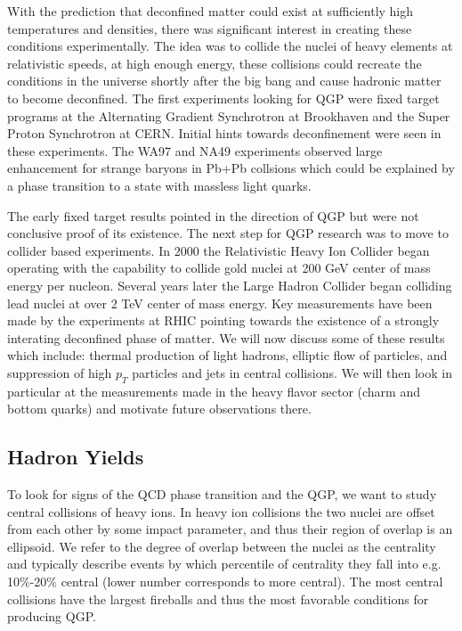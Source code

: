 With the prediction that deconfined matter could exist at sufficiently high temperatures and densities, there was significant interest in creating these conditions experimentally. The idea was to collide the nuclei of heavy elements at relativistic speeds, at high enough energy, these collisions could recreate the conditions in the universe shortly after the big bang and cause hadronic matter to become deconfined. The first experiments looking for QGP were fixed target programs at the Alternating Gradient Synchrotron at Brookhaven and the Super Proton Synchrotron at CERN. Initial hints towards deconfinement were seen in these experiments. The WA97 and NA49 experiments observed large enhancement for strange baryons in Pb+Pb collsions which could be explained by a phase transition to a state with massless light quarks.

The early fixed target results pointed in the direction of QGP but were not conclusive proof of its existence. The next step for QGP research was to move to collider based experiments. In 2000 the Relativistic Heavy Ion Collider began operating with the capability to collide gold nuclei at 200 GeV center of mass energy per nucleon. Several years later the Large Hadron Collider began colliding lead nuclei at over 2 TeV center of mass energy. Key measurements have been made by the experiments at RHIC pointing towards the existence of a strongly interating deconfined phase of matter. We will now discuss some of these results which include: thermal production of light hadrons, elliptic flow of particles, and suppression of high $p_T$ particles and jets in central collisions. We will then look in particular at the measurements made in the heavy flavor sector (charm and bottom quarks) and motivate future observations there.

\subsection{Hadron Yields}

To look for signs of the QCD phase transition and the QGP, we want to study central collisions of heavy ions. In heavy ion collisions the two nuclei are offset from each other by some impact parameter, and thus their region of overlap is an ellipsoid. We refer to the degree of overlap between the nuclei as the centrality and typically describe events by which percentile of centrality they fall into e.g. 10\%-20\% central (lower number corresponds to more central). The most central collisions have the largest fireballs and thus the most favorable conditions for producing QGP. 

